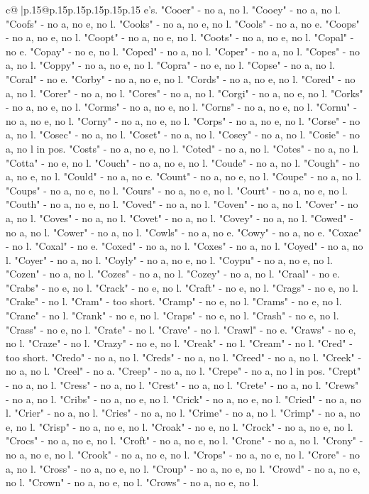 \documentclass{article}
\begin{document}
{\begin{supertabular}{c@{$\;$}|p{.15\linewidth}@{}p{.15\linewidth}p{.15\linewidth}p{.15\linewidth}p{.15\linewidth}p{.15\linewidth}}
{{{e's. "Cooer" {-} no a, no l. "Cooey" {-} no a, no l. "Coofs" {-} no a, no e, no l. "Cooks" {-} no a, no e, no l. "Cools" {-} no a, no e. "Coops" {-} no a, no e, no l. "Coopt" {-} no a, no e, no l. "Coots" {-} no a, no e, no l. "Copal" {-} no e. "Copay" {-} no e, no l. "Coped" {-} no a, no l. "Coper" {-} no a, no l. "Copes" {-} no a, no l. "Coppy" {-} no a, no e, no l. "Copra" {-} no e, no l. "Copse" {-} no a, no l. "Coral" {-} no e. "Corby" {-} no a, no e, no l. "Cords" {-} no a, no e, no l. "Cored" {-} no a, no l. "Corer" {-} no a, no l. "Cores" {-} no a, no l. "Corgi" {-} no a, no e, no l. "Corks" {-} no a, no e, no l. "Corms" {-} no a, no e, no l. "Corns" {-} no a, no e, no l. "Cornu" {-} no a, no e, no l. "Corny" {-} no a, no e, no l. "Corps" {-} no a, no e, no l. "Corse" {-} no a, no l. "Cosec" {-} no a, no l. "Coset" {-} no a, no l. "Cosey" {-} no a, no l. "Cosie" {-} no a, no l in pos. "Costs" {-} no a, no e, no l. "Coted" {-} no a, no l. "Cotes" {-} no a, no l. "Cotta" {-} no e, no l. "Couch" {-} no a, no e, no l. "Coude" {-} no a, no l. "Cough" {-} no a, no e, no l. "Could" {-} no a, no e. "Count" {-} no a, no e, no l. "Coupe" {-} no a, no l. "Coups" {-} no a, no e, no l. "Cours" {-} no a, no e, no l. "Court" {-} no a, no e, no l. "Couth" {-} no a, no e, no l. "Coved" {-} no a, no l. "Coven" {-} no a, no l. "Cover" {-} no a, no l. "Coves" {-} no a, no l. "Covet" {-} no a, no l. "Covey" {-} no a, no l. "Cowed" {-} no a, no l. "Cower" {-} no a, no l. "Cowls" {-} no a, no e. "Cowy" {-} no a, no e. "Coxae" {-} no l. "Coxal" {-} no e. "Coxed" {-} no a, no l. "Coxes" {-} no a, no l. "Coyed" {-} no a, no l. "Coyer" {-} no a, no l. "Coyly" {-} no a, no e, no l. "Coypu" {-} no a, no e, no l. "Cozen" {-} no a, no l. "Cozes" {-} no a, no l. "Cozey" {-} no a, no l. "Craal" {-} no e. "Crabs" {-} no e, no l. "Crack" {-} no e, no l. "Craft" {-} no e, no l. "Crags" {-} no e, no l. "Crake" {-} no l. "Cram" {-} too short. "Cramp" {-} no e, no l. "Crams" {-} no e, no l. "Crane" {-} no l. "Crank" {-} no e, no l. "Craps" {-} no e, no l. "Crash" {-} no e, no l. "Crass" {-} no e, no l. "Crate" {-} no l. "Crave" {-} no l. "Crawl" {-} no e. "Craws" {-} no e, no l. "Craze" {-} no l. "Crazy" {-} no e, no l. "Creak" {-} no l. "Cream" {-} no l. "Cred" {-} too short. "Credo" {-} no a, no l. "Creds" {-} no a, no l. "Creed" {-} no a, no l. "Creek" {-} no a, no l. "Creel" {-} no a. "Creep" {-} no a, no l. "Crepe" {-} no a, no l in pos. "Crept" {-} no a, no l. "Cress" {-} no a, no l. "Crest" {-} no a, no l. "Crete" {-} no a, no l. "Crews" {-} no a, no l. "Cribs" {-} no a, no e, no l. "Crick" {-} no a, no e, no l. "Cried" {-} no a, no l. "Crier" {-} no a, no l. "Cries" {-} no a, no l. "Crime" {-} no a, no l. "Crimp" {-} no a, no e, no l. "Crisp" {-} no a, no e, no l. "Croak" {-} no e, no l. "Crock" {-} no a, no e, no l. "Crocs" {-} no a, no e, no l. "Croft" {-} no a, no e, no l. "Crone" {-} no a, no l. "Crony" {-} no a, no e, no l. "Crook" {-} no a, no e, no l. "Crops" {-} no a, no e, no l. "Crore" {-} no a, no l. "Cross" {-} no a, no e, no l. "Croup" {-} no a, no e, no l. "Crowd" {-} no a, no e, no l. "Crown" {-} no a, no e, no l. "Crows" {-} no a, no e, no l. }}}
\end{supertabular}}
\end{document}
